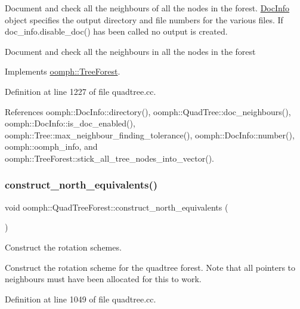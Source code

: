 Document and check all the neighbours of all the nodes in the forest. \hyperlink{classoomph_1_1DocInfo}{Doc\+Info} object specifies the output directory and file numbers for the various files. If {\ttfamily doc\+\_\+info.\+disable\+\_\+doc()} has been called no output is created. 

Document and check all the neighbours in all the nodes in the forest 

Implements \hyperlink{classoomph_1_1TreeForest_a0e6a7f821d9f14374c6d23d8766c7679}{oomph\+::\+Tree\+Forest}.



Definition at line 1227 of file quadtree.\+cc.



References oomph\+::\+Doc\+Info\+::directory(), oomph\+::\+Quad\+Tree\+::doc\+\_\+neighbours(), oomph\+::\+Doc\+Info\+::is\+\_\+doc\+\_\+enabled(), oomph\+::\+Tree\+::max\+\_\+neighbour\+\_\+finding\+\_\+tolerance(), oomph\+::\+Doc\+Info\+::number(), oomph\+::oomph\+\_\+info, and oomph\+::\+Tree\+Forest\+::stick\+\_\+all\+\_\+tree\+\_\+nodes\+\_\+into\+\_\+vector().

\mbox{\label{classoomph_1_1QuadTreeForest_aa425f1cf4268764e5ab3e4144a70a973}} 
\subsubsection{\texorpdfstring{construct\+\_\+north\+\_\+equivalents()}{construct\_north\_equivalents()}}
{\footnotesize\ttfamily void oomph\+::\+Quad\+Tree\+Forest\+::construct\+\_\+north\+\_\+equivalents (\begin{DoxyParamCaption}{ }\end{DoxyParamCaption})\hspace{0.3cm}{\ttfamily [private]}}



Construct the rotation schemes. 

Construct the rotation scheme for the quadtree forest. Note that all pointers to neighbours must have been allocated for this to work. 

Definition at line 1049 of file quadtree.\+cc.




